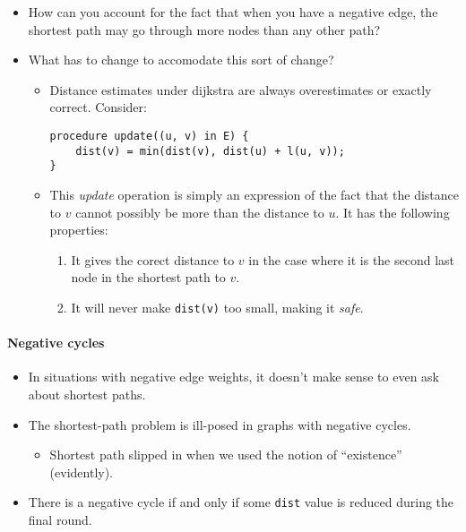 \documentclass[a4paper,11pt]{article}
\begin{document}
\begin{itemize}
\itemsep1pt\parskip0pt
\item
  How can you account for the fact that when you have a negative edge,
  the shortest path may go through more nodes than any other path?
\item
  What has to change to accomodate this sort of change?

  \begin{itemize}
  \item
    Distance estimates under dijkstra are always overestimates or
    exactly correct. Consider:

\begin{verbatim}
procedure update((u, v) in E) {
    dist(v) = min(dist(v), dist(u) + l(u, v));
}
\end{verbatim}
  \item
    This \emph{update} operation is simply an expression of the fact
    that the distance to $v$ cannot possibly be more than the distance
    to $u$. It has the following properties:

    \begin{enumerate}
    \def\labelenumi{\arabic{enumi}.}
    \itemsep1pt\parskip0pt
    \item
      It gives the corect distance to $v$ in the case where it is the
      second last node in the shortest path to $v$.
    \item
      It will never make \texttt{dist(v)} too small, making it
      \emph{safe}.
    \end{enumerate}
  \end{itemize}
\end{itemize}

\paragraph{Negative cycles}\label{negative-cycles}

\begin{itemize}
\itemsep1pt\parskip0pt
\item
  In situations with negative edge weights, it doesn't make sense to
  even ask about shortest paths.
\item
  The shortest-path problem is ill-posed in graphs with negative cycles.

  \begin{itemize}
  \itemsep1pt\parskip0pt
  \item
    Shortest path slipped in when we used the notion of ``existence''
    (evidently).
  \end{itemize}
\item
  There is a negative cycle if and only if some \texttt{dist} value is
  reduced during the final round.
\end{itemize}
\end{document}
